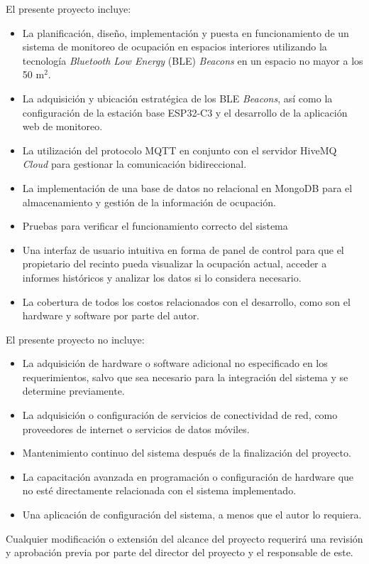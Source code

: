 \documentclass[
11pt, %
]{charter}
\begin{document}
El presente proyecto incluye:
\begin{itemize}
	\item La planificación, diseño, implementación y puesta en funcionamiento de un sistema de monitoreo de ocupación en espacios interiores utilizando la tecnología \textit{Bluetooth Low Energy} (BLE) \textit{Beacons} en un espacio no mayor a los 50 m$^2$.
	\item La adquisición y ubicación estratégica de los BLE \textit{Beacons}, así como la configuración de la estación base ESP32-C3 y el desarrollo de la aplicación web de monitoreo. 
	\item La utilización del protocolo MQTT en conjunto con el servidor HiveMQ \textit{Cloud} para gestionar la comunicación bidireccional.
	\item La implementación de una base de datos no relacional en MongoDB para el almacenamiento y gestión de la información de ocupación. 
	\item Pruebas para verificar el funcionamiento correcto del sistema 
	\item Una interfaz de usuario intuitiva en forma de panel de control para que el propietario del recinto pueda visualizar la ocupación actual, acceder a informes históricos y analizar los datos si lo considera necesario.
	\item La cobertura de todos los costos relacionados con el desarrollo, como son el hardware y software por parte del autor.
\end{itemize}


El presente proyecto no incluye:
\begin{itemize}
	\item La adquisición de hardware o software adicional no especificado en los requerimientos, salvo que sea necesario para la integración del sistema y se determine previamente.
	\item La adquisición o configuración de servicios de conectividad de red, como proveedores de internet o servicios de datos móviles.
	\item Mantenimiento continuo del sistema después de la finalización del proyecto.
	\item La capacitación avanzada en programación o configuración de hardware que no esté directamente relacionada con el sistema implementado.
	\item Una aplicación de configuración del sistema, a menos que el autor lo requiera.
\end{itemize}

Cualquier modificación o extensión del alcance del proyecto requerirá una revisión y aprobación previa por parte del director del proyecto y el responsable de este.
\end{document}
